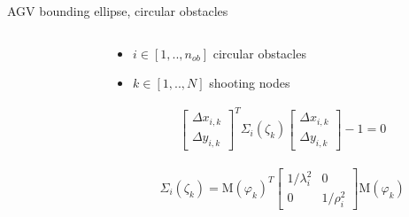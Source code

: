 \documentclass[10pt,aspectratio=1610]{beamer} %
\begin{document}
\begin{frame}{AGV bounding ellipse, circular obstacles}
	\begin{columns}[onlytextwidth]
		\begin{column}{0.45\textwidth}
			\begin{center}
			\def\svgwidth{1.1\textwidth}
			
			\end{center}
		\end{column}

		\begin{column}{0.45\textwidth}
			\begin{itemize}[label=\textbullet]
				\item ${i} \in [1, .., n_{ob}]$ circular obstacles
				\item ${k} \in [1, .., N]$ shooting nodes
			\end{itemize}
		\begin{align*}
			\begin{bmatrix}
				\Delta x_{i, k}\\
				\Delta y_{i, k}
			\end{bmatrix}^T
			\Sigma_{i}(\zeta_{k})
			\begin{bmatrix}
				\Delta x_{i, k}\\
				\Delta y_{i, k}
			\end{bmatrix} - 1 = 0
		\end{align*}

		\begin{align*}\Sigma_{i}(\zeta_{k}) =     
			\mathrm{M}(\varphi_{k})^T
			\begin{bmatrix}
				1/\lambda^{2}_{i} & 0\\
				0 & 1/\rho^{2}_{i}
			\end{bmatrix}
			\mathrm{M}(\varphi_{k})
		\end{align*}
		\end{column}
	\end{columns}
\end{frame}
\end{document}
